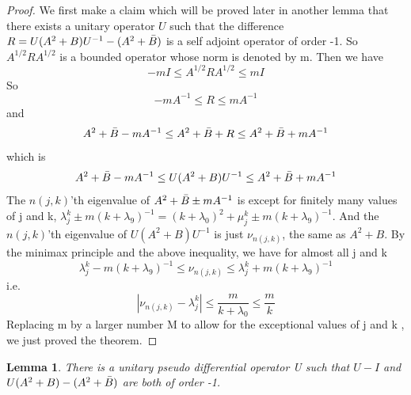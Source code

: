 \documentclass[10pt]{amsart}
\newtheorem{lemma}[theorem]{Lemma}
\newcommand{\1}{\mathbb{1}}
\begin{document}
\begin{proof}
    We first make a claim which will be proved later in another lemma that there exists a unitary operator $U$ such that the difference $R = U ( A^2 +B) U^{-1} - (A^2 + \Bar{B})$ is a self adjoint operator of order -1. So $A^{1/2}RA^{1/2}$ is a bounded operator whose norm is denoted by m. Then we have
    \[
     - mI \leq A^{1/2}RA^{1/2} \leq mI
    \]
    So
    \[
     - mA^{-1} \leq R \leq mA^{-1}
    \]
    and 
    \[
    A^2 + \Bar{B} - mA^{-1} \leq A^2 + \Bar{B} +R \leq A^2 + \Bar{B} + mA^{-1}
    \]
    which is 
    \[
    A^2 + \Bar{B}- mA^{-1} \leq  U(A^2 +B )U^{-1}\leq A^2 + \Bar{B} + mA^{-1}
    \]
    The $n(j,k)$'th eigenvalue of $A^2 +\Bar{B} \pm mA^{-1}$ is except for finitely many values of j and k, $\lambda_j^k \pm m (k+\lambda_9)^{-1}= (k+\lambda_0)^2 + \mu_j^k \pm m (k+\lambda_9)^{-1}$. And the $n(j,k)$'th eigenvalue of $U(A^2 +B )U^{-1}$ is just $\nu_{n(j,k)}$, the same as $A^2 + B$. By the minimax principle and the above inequality, we have for almost all j and k
    \[
    \lambda_j^k - m (k+\lambda_9)^{-1} \leq \nu_{n(j,k)} \leq \lambda_j^k + m (k+\lambda_9)^{-1}
    \]
    i.e.
    \[
    |\nu_{n(j,k)} - \lambda_j^k | \leq \frac{m}{k+\lambda_0} \leq \frac{m}{k}
    \]
    Replacing m by a larger number M to allow for the exceptional values of j and k , we just proved the theorem.
    
\end{proof}

\begin{lemma}
     There is a unitary pseudo differential operator U such that $U - I$ and $U(A^2 +B ) - (A^2 + \Bar{B})$ are both of order -1.
\end{lemma}
\end{document}
